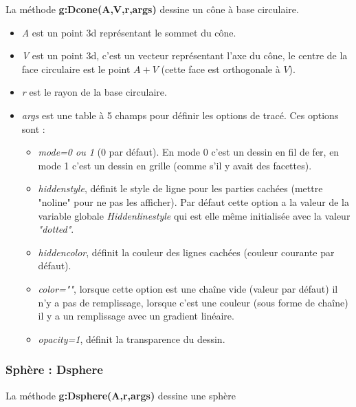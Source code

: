 La méthode \textbf{g:Dcone(A,V,r,args)} dessine un cône à base circulaire.

\begin{itemize}
    \item \emph{A} est un point 3d représentant le sommet du cône.
    \item \emph{V} est un point 3d, c'est un vecteur représentant l'axe du cône, le centre de la face circulaire est le point $A+V$ (cette face est orthogonale à $V$).
    \item \emph{r} est le rayon de la base circulaire.
    \item \emph{args} est une table à 5 champs pour définir les options de tracé. Ces options sont :
        \begin{itemize}
            \item \emph{mode=0 ou 1} (0 par défaut). En mode 0 c'est un dessin en fil de fer, en mode 1 c'est un dessin en grille (comme s'il y avait des facettes).
            \item \emph{hiddenstyle}, définit le style de ligne pour les parties cachées (mettre "noline" pour ne pas les afficher). Par défaut cette option a la valeur de la variable globale \emph{Hiddenlinestyle} qui est elle même initialisée avec la valeur \emph{"dotted"}.
            \item \emph{hiddencolor}, définit la couleur des lignes cachées (couleur courante par défaut).
            \item \emph{color=""}, lorsque cette option est une chaîne vide (valeur par défaut) il n'y a pas de remplissage,  lorsque c'est une couleur (sous forme de chaîne) il y a un remplissage avec un gradient linéaire.
            \item \emph{opacity=1}, définit la transparence du dessin.
        \end{itemize}
\end{itemize}

\subsubsection{ Sphère : Dsphere}

La méthode \textbf{g:Dsphere(A,r,args)} dessine une sphère

